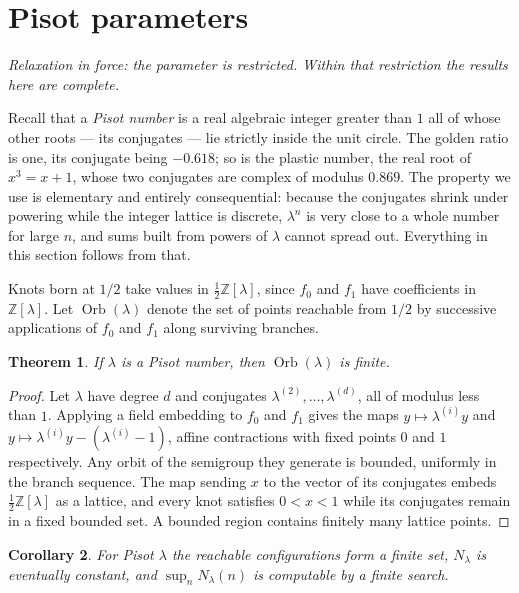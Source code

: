 \documentclass[11pt,reqno]{amsart}
\theoremstyle{plain}
\newtheorem{theorem}{Theorem}
\newtheorem{corollary}[theorem]{Corollary}
\theoremstyle{definition}
\theoremstyle{remark}
\newcommand{\Z}{\mathbb{Z}}
\DeclareMathOperator{\Orb}{Orb}
\begin{document}
\section{Pisot parameters}\label{sec:pisot}

\emph{Relaxation in force: the parameter is restricted. Within that
restriction the results here are complete.}

Recall that a \emph{Pisot number} is a real algebraic integer greater than $1$
all of whose other roots --- its conjugates --- lie strictly inside the unit
circle. The golden ratio is one, its conjugate being $-0.618$; so is the
plastic number, the real root of $x^3=x+1$, whose two conjugates are complex
of modulus $0.869$. The property we use is elementary and entirely
consequential: because the conjugates shrink under powering while the integer
lattice is discrete, $\lambda^n$ is very close to a whole number for large $n$,
and sums built from powers of $\lambda$ cannot spread out. Everything in this
section follows from that.

Knots born at $1/2$ take values in $\tfrac12\Z[\lambda]$, since $f_0$ and $f_1$
have coefficients in $\Z[\lambda]$. Let $\Orb(\lambda)$ denote the set of points
reachable from $1/2$ by successive applications of $f_0$ and $f_1$ along
surviving branches.

\begin{theorem}\label{thm:pisot}
If $\lambda$ is a Pisot number, then $\Orb(\lambda)$ is finite.
\end{theorem}

\begin{proof}
Let $\lambda$ have degree $d$ and conjugates $\lambda^{(2)},\dots,\lambda^{(d)}$,
all of modulus less than $1$. Applying a field embedding to $f_0$ and $f_1$
gives the maps $y\mapsto\lambda^{(i)}y$ and
$y\mapsto\lambda^{(i)}y-(\lambda^{(i)}-1)$, affine contractions with fixed
points $0$ and $1$ respectively. Any orbit of the semigroup they generate is
bounded, uniformly in the branch sequence. The map sending $x$ to the vector of
its conjugates embeds $\tfrac12\Z[\lambda]$ as a lattice, and every knot
satisfies $0<x<1$ while its conjugates remain in a fixed bounded set. A bounded
region contains finitely many lattice points.
\end{proof}

\begin{corollary}\label{cor:decide}
For Pisot $\lambda$ the reachable configurations form a finite set,
$N_\lambda$ is eventually constant, and $\sup_n N_\lambda(n)$ is computable by a
finite search.
\end{corollary}
\end{document}
